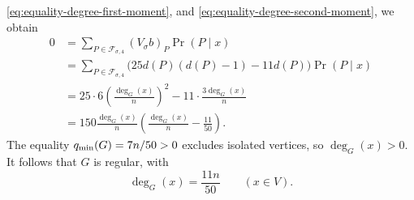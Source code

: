 \eqref{eq:equality-degree-first-moment}, and
\eqref{eq:equality-degree-second-moment}, we obtain
\begin{align*}
0&=\sum_{P\in\mathcal F_{\sigma,4}}(V_\sigma b)_P\Pr(P\mid x)\\
&=\sum_{P\in\mathcal F_{\sigma,4}}
\big(25d(P)(d(P)-1)-11d(P)\big)\Pr(P\mid x)\\
&=25\cdot6\left(\frac{\deg_G(x)}n\right)^2
-11\cdot\frac{3\deg_G(x)}n\\
&=150\frac{\deg_G(x)}n
\left(\frac{\deg_G(x)}n-\frac{11}{50}\right).
\end{align*}
The equality $q_{\min}(G)=7n/50>0$ excludes isolated vertices,
so $\deg_G(x)>0$.
It follows that $G$ is regular, with
\begin{equation}\label{eq:equality-regularity}
\deg_G(x)=\frac{11n}{50}\qquad(x\in V).
\end{equation}

